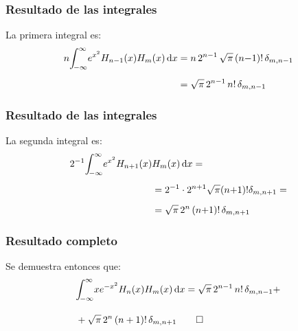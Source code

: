 \documentclass[12pt]{beamer}
\begin{document}
\begin{frame}
\frametitle{Resultado de las integrales}
La primera integral es:
\pause
\begin{align*}
n \scaleint{5ex}_{\bs -\infty}^{\infty} e^{x^{2}} H_{n-1} (x) H_{m}(x) \dd{x} &= n \, 2^{n-1} \, \sqrt{\pi} \, (n {-} 1)! \, \delta_{m, n-1} \\[0.5em]
&= \sqrt{\pi} \, 2^{n-1} \, n! \, \delta_{m, n-1}
\end{align*}
\end{frame}
\begin{frame}
\frametitle{Resultado de las integrales}
La segunda integral es:
\pause
\begin{align*}
2^{-1} \scaleint{5ex}_{\bs -\infty}^{\infty} e^{x^{2}} H_{n+1} (x) &H_{m}(x) \dd{x} = \\[0.5em]
&= 2^{-1} \cdot 2^{n+1} \sqrt{\pi} (n {+} 1)! \delta_{m,n+1} = \\[0.5em]
&= \sqrt{\pi} \, 2^{n} \, (n {+} 1)! \, \delta_{m,n+1}
\end{align*}
\end{frame}
\begin{frame}
\frametitle{Resultado completo}
Se demuestra entonces que:
\begin{align*}
&\scaleint{5ex}_{\bs -\infty}^{\infty} x e^{-x^{2}} H_{n}(x) H_{m}(x) \dd{x} = \sqrt{\pi} \, 2^{n-1} \, n! \, \delta_{m,n-1} + \\[1em]
&+ \sqrt{\pi} \, 2^{n} \, (n+1)! \, \delta_{m,n+1} \qed
\end{align*}
\end{frame}
\end{document}
